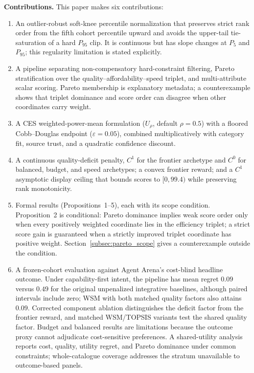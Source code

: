 \documentclass[pdflatex,sn-mathphys-num]{sn-jnl}
\theoremstyle{thmstyleone}
\theoremstyle{thmstylethree}
\begin{document}
\textbf{Contributions.} This paper makes six contributions:
\begin{enumerate}
  \item An outlier-robust soft-knee percentile normalization that preserves strict rank order from the fifth cohort percentile upward and avoids the upper-tail tie-saturation of a hard $P_{95}$ clip. It is continuous but has slope changes at $P_5$ and $P_{95}$; this regularity limitation is stated explicitly.
  \item A pipeline separating non-compensatory hard-constraint filtering, Pareto stratification over the quality--affordability--speed triplet, and multi-attribute scalar scoring. Pareto membership is explanatory metadata; a counterexample shows that triplet dominance and score order can disagree when other coordinates carry weight.
  \item A CES weighted-power-mean formulation ($U_\rho$, default $\rho=0.5$) with a floored Cobb--Douglas endpoint ($\varepsilon=0.05$), combined multiplicatively with category fit, source trust, and a quadratic confidence discount.
  \item A continuous quality-deficit penalty, $C^1$ for the frontier archetype and $C^0$ for balanced, budget, and speed archetypes; a convex frontier reward; and a $C^1$ asymptotic display ceiling that bounds scores to $[0,99.4)$ while preserving rank monotonicity.
  \item Formal results (Propositions~1--5), each with its scope condition. Proposition~2 is conditional: Pareto dominance implies weak score order only when every positively weighted coordinate lies in the efficiency triplet; a strict score gain is guaranteed when a strictly improved triplet coordinate has positive weight. Section~\ref{subsec:pareto_scope} gives a counterexample outside the condition.
  \item A frozen-cohort evaluation against Agent Arena's cost-blind headline outcome. Under capability-first intent, the pipeline has mean regret $0.09$ versus $0.49$ for the original unpenalized integrative baselines, although paired intervals include zero; WSM with both matched quality factors also attains $0.09$. Corrected component ablation distinguishes the deficit factor from the frontier reward, and matched WSM/TOPSIS variants test the shared quality factor. Budget and balanced results are limitations because the outcome proxy cannot adjudicate cost-sensitive preferences. A shared-utility analysis reports cost, quality, utility regret, and Pareto dominance under common constraints; whole-catalogue coverage addresses the stratum unavailable to outcome-based panels.
\end{enumerate}
\end{document}
